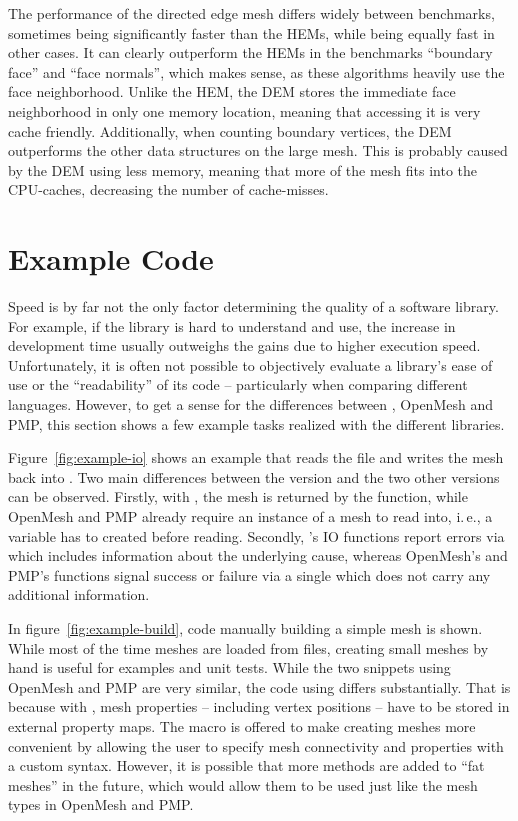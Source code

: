 The performance of the directed edge mesh differs widely between benchmarks, sometimes being significantly faster than the HEMs, while being equally fast in other cases.
It can clearly outperform the HEMs in the benchmarks \enquote{boundary face} and \enquote{face normals}, which makes sense, as these algorithms heavily use the face neighborhood.
Unlike the HEM, the DEM stores the immediate face neighborhood in only one memory location, meaning that accessing it is very cache friendly.
Additionally, when counting boundary vertices, the DEM outperforms the other data structures on the large mesh.
This is probably caused by the DEM using less memory, meaning that more of the mesh fits into the CPU-caches, decreasing the number of cache-misses.



\newpage
\section{Example Code}

Speed is by far not the only factor determining the quality of a software library.
For example, if the library is hard to understand and use, the increase in development time usually outweighs the gains due to higher execution speed.
Unfortunately, it is often not possible to objectively evaluate a library's ease of use or the \enquote{readability} of its code -- particularly when comparing different languages.
However, to get a sense for the differences between , OpenMesh and PMP, this section shows a few example tasks realized with the different libraries.

Figure~\ref{fig:example-io} shows an example that reads the file  and writes the mesh back into .
Two main differences between the  version and the two other versions can be observed.
Firstly, with , the mesh is returned by the  function, while OpenMesh and PMP already require an instance of a mesh to read into, i.\,e., a variable has to created before reading.
Secondly, 's IO functions report errors via  which includes information about the underlying cause, whereas OpenMesh's and PMP's functions signal success or failure via a single  which does not carry any additional information.

In figure~\ref{fig:example-build}, code manually building a simple mesh is shown.
While most of the time meshes are loaded from files, creating small meshes by hand is useful for examples and unit tests.
While the two snippets using OpenMesh and PMP are very similar, the code using  differs substantially.
That is because with , mesh properties -- including vertex positions -- have to be stored in external property maps.
The  macro is offered to make creating meshes more convenient by allowing the user to specify mesh connectivity and properties with a custom syntax.
However, it is possible that more methods are added to \enquote{fat meshes} in the future, which would allow them to be used just like the mesh types in OpenMesh and PMP.


